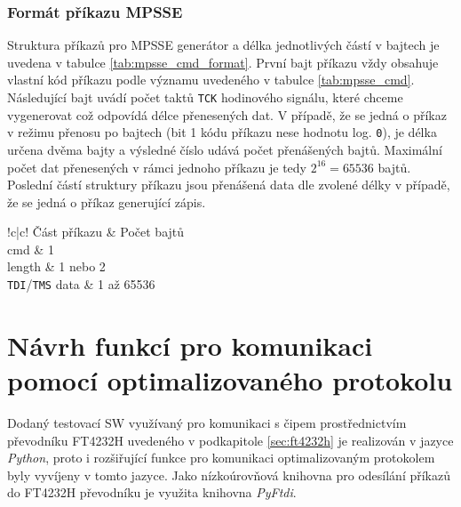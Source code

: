 \subsubsection{Formát příkazu \acs{MPSSE}}
Struktura příkazů pro \acs{MPSSE} generátor a délka jednotlivých částí v bajtech je uvedena v tabulce \ref{tab:mpsse_cmd_format}. První bajt příkazu vždy obsahuje vlastní kód příkazu podle významu uvedeného v tabulce \ref{tab:mpsse_cmd}. Následující bajt uvádí počet taktů \texttt{\acs{TCK}} hodinového signálu, které chceme vygenerovat což odpovídá délce přenesených dat. V případě, že se jedná o příkaz v režimu přenosu po bajtech (bit 1 kódu příkazu nese hodnotu log. \texttt{0}), je délka určena dvěma bajty a výsledné číslo udává počet přenášených bajtů. Maximální počet dat přenesených v rámci jednoho příkazu je tedy \(2^{16} = 65536\) bajtů. Poslední částí struktury příkazu jsou přenášená data dle zvolené délky v případě, že se jedná o příkaz generující zápis.

\begin{table}[!h]
  \caption{Formát příkazů \acs{MPSSE} \cite{MPSSE_cmd}}
  \begin{center}
  	\small
	  \begin{tabular}{!{\vrule width 1.2pt}c|c!{\vrule width 1.2pt}}
	    Část příkazu & Počet bajtů\\
			cmd & 1\\
			\hline
			length & 1 nebo 2\\
			\hline
			\texttt{\acs{TDI}}/\texttt{\acs{TMS}} data & 1 až 65536\\
			\hline
		\end{tabular}
  \end{center}
	\label{tab:mpsse_cmd_format}
\end{table}

\section{Návrh funkcí pro komunikaci pomocí optimalizovaného protokolu}
Dodaný testovací SW využívaný pro komunikaci s čipem prostřednictvím převodníku FT4232H uvedeného v podkapitole \ref{sec:ft4232h} je realizován v jazyce \textit{Python}, proto i rozšiřující funkce pro komunikaci optimalizovaným protokolem byly vyvíjeny v tomto jazyce. Jako nízkoúrovňová knihovna pro odesílání příkazů do FT4232H převodníku je využita knihovna \textit{PyFtdi}.	\cite{PyFtdi_doc}

